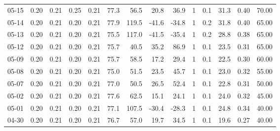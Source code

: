 \begin{threeparttable}
{\begin{tabular}{lrrrrrrrrrrrrr}
  05-15 &          0.20 &          0.21 &          0.25 &        0.21 &                77.3 &                56.5 &       20.8 &         36.9 &              1 &                 0.1 &             31.3 &            0.40 &                  70.00 \\
  05-14 &          0.20 &          0.21 &          0.20 &        0.21 &                77.9 &               119.5 &      -41.6 &        -34.8 &              1 &                 0.2 &             31.8 &            0.40 &                  65.00 \\
  05-13 &          0.20 &          0.21 &          0.20 &        0.21 &                75.5 &               117.0 &      -41.5 &        -35.4 &              1 &                 0.2 &             28.8 &            0.38 &                  65.00 \\
  05-12 &          0.20 &          0.21 &          0.20 &        0.21 &                75.7 &                40.5 &       35.2 &         86.9 &              1 &                 0.1 &             23.5 &            0.31 &                  65.00 \\
  05-09 &          0.20 &          0.21 &          0.20 &        0.21 &                75.7 &                58.5 &       17.2 &         29.4 &              1 &                 0.1 &             22.5 &            0.30 &                  60.00 \\
  05-08 &          0.20 &          0.21 &          0.20 &        0.21 &                75.0 &                51.5 &       23.5 &         45.7 &              1 &                 0.1 &             23.0 &            0.32 &                  55.00 \\
  05-07 &          0.20 &          0.21 &          0.20 &        0.21 &                77.0 &                50.5 &       26.5 &         52.4 &              1 &                 0.1 &             22.8 &            0.31 &                  50.00 \\
  05-02 &          0.20 &          0.21 &          0.20 &        0.21 &                77.6 &                62.5 &       15.1 &         24.1 &              1 &                 0.1 &             24.0 &            0.32 &                  45.00 \\
  05-01 &          0.20 &          0.21 &          0.20 &        0.21 &                77.1 &               107.5 &      -30.4 &        -28.3 &              1 &                 0.1 &             24.8 &            0.34 &                  40.00 \\
  04-30 &          0.20 &          0.21 &          0.20 &        0.21 &                76.7 &                57.0 &       19.7 &         34.5 &              1 &                 0.1 &             19.6 &            0.27 &                  40.00 \\

\end{tabular}}
\end{threeparttable}
